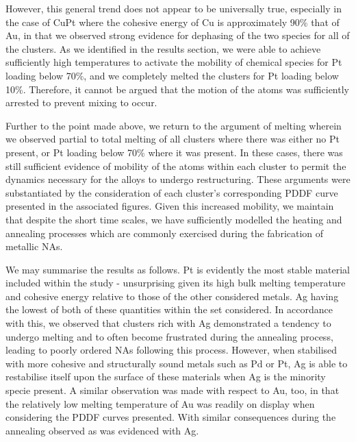 However, this general trend does not appear to be universally true, especially in the case of CuPt where the cohesive energy of Cu is approximately 90\% that of Au, in that we observed strong evidence for dephasing of the two species for all of the clusters. As we identified in the results section, we were able to achieve sufficiently high temperatures to activate the mobility of chemical species for Pt loading below 70\%, and we completely melted the clusters for Pt loading below 10\%. Therefore, it cannot be argued that the motion of the atoms was sufficiently arrested to prevent mixing to occur.

Further to the point made above, we return to the argument of melting wherein we observed partial to total melting of all clusters where there was either no Pt present, or Pt loading below 70\% where it was present. In these cases, there was still sufficient evidence of mobility of the atoms within each cluster to permit the dynamics necessary for the alloys to undergo restructuring. These arguments were substantiated by the consideration of each cluster's corresponding PDDF curve presented in the associated figures. Given this increased mobility, we maintain that despite the short time scales, we have sufficiently modelled the heating and annealing processes which are commonly exercised during the fabrication of metallic NAs.

We may summarise the results as follows. Pt is evidently the most stable material included within the study - unsurprising given its high bulk melting temperature and cohesive energy relative to those of the other considered metals. Ag having the lowest of both of these quantities within the set considered. In accordance with this, we observed that clusters rich with Ag demonstrated a tendency to undergo melting and to often become frustrated during the annealing process, leading to poorly ordered NAs following this process. However, when stabilised with more cohesive and structurally sound metals such as Pd or Pt, Ag is able to restabilise itself upon the surface of these materials when Ag is the minority specie present. A similar observation was made with respect to Au, too, in that the relatively low melting temperature of Au was readily on display when considering the PDDF curves presented. With similar consequences during the annealing observed as was evidenced with Ag.

